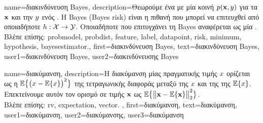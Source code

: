 {name={\foreignlanguage{greek}{διακινδύνευση} Bayes},
	description={\foreignlanguage{greek}{Θεωρούμε ένα}  \foreignlanguage{greek}{με μία κοινή}  
		$p({\bf x},y)$ \foreignlanguage{greek}{για τα}  ${\bf x}$ 
		\foreignlanguage{greek}{και την}  $y$ \foreignlanguage{greek}{ενός} . 
		\foreignlanguage{greek}{Η} 
		 Bayes (Bayes risk) \foreignlanguage{greek}{είναι η}  \foreignlanguage{greek}{πιθανή} 
		 \foreignlanguage{greek}{που μπορεί να επιτευχθεί από οποιαδήποτε}  
		$h: \mathcal{X} \rightarrow \mathcal{Y}$. \foreignlanguage{greek}{Οποιαδήποτε}  \foreignlanguage{greek}{που 
		επιτυγχάνει τη}  Bayes \foreignlanguage{greek}{αναφέρεται ως μία}  \cite{LC}.\\
		\foreignlanguage{greek}{Βλέπε επίσης:} \gls{probmodel}, \gls{probdist}, \gls{feature}, \gls{label}, \gls{datapoint}, \gls{risk}, \gls{minimum}, 
		\gls{hypothesis}, \gls{bayesestimator}.},
	first={\foreignlanguage{greek}{διακινδύνευση} Bayes},
	text={\foreignlanguage{greek}{διακινδύνευση} Bayes},
	user1={\foreignlanguage{greek}{διακινδύνευση} Bayes}, %
	user2={\foreignlanguage{greek}{διακινδύνευσης} Bayes} %
}

{name={\foreignlanguage{greek}{διακύμανση}},
	description={\foreignlanguage{greek}{Η διακύμανση μίας} 
		 \foreignlanguage{greek}{πραγματικής τιμής $x$ ορίζεται ως η}  
		$\mathbb{E}\big\{ \big( x - \mathbb{E}\{x \} \big)^{2} \big\}$ \foreignlanguage{greek}{της τετραγωνικής διαφοράς μεταξύ της $x$ 
		και της}  \foreignlanguage{greek}{της $\mathbb{E}\{x \}$. Επεκτείνουμε αυτόν τον ορισμό σε}  
		 \foreignlanguage{greek}{τιμής ${\bf x}$ ως} $\mathbb{E}\big\{ \big\| {\bf x} - \mathbb{E}\{{\bf x} \} \big\|_{2}^{2} \big\}$.\\
		\foreignlanguage{greek}{Βλέπε επίσης:} \gls{rv}, \gls{expectation}, \gls{vector}.} ,
	first={\foreignlanguage{greek}{διακύμανση}},
	text={\foreignlanguage{greek}{διακύμανση}},
	user1={\foreignlanguage{greek}{διακύμανση}}, %
   	user2={\foreignlanguage{greek}{διακύμανσης}}, %
	user3={\foreignlanguage{greek}{διακύμανση}} %
}

